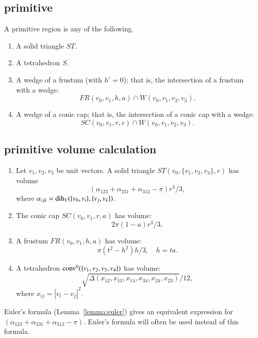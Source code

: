 \subsection{primitive}

\begin{definition} A primitive region is any of the following.

\begin{enumerate}%
 \item A solid triangle $ST$.
 \item A tetrahedron $S$.
 \item A wedge of a frustum (with $h'=0$); 
that is, the intersection of a frustum with
 a wedge:
    $$
     FR(v_0,v_1,h,a) \cap W(v_0,v_1,v_2,v_3).
    $$
\item A wedge of a conic cap; that is, the intersection of a conic cap
with
    a wedge:
    $$
    SC(v_0,v_1,r,c) \cap W(v_0,v_1,v_2,v_3).
    $$
\end{enumerate}

\end{definition}

\subsection{primitive volume calculation}\label{sec:primitive}

\begin{lemma} 
\begin{enumerate} 
 \item {} Let $v_1,v_2,v_3$ be unit vectors.
   A solid triangle $ST(v_0,\{v_1,v_2,v_3\},r)$ has volume
   $$
   (\alpha_{123}+\alpha_{231}+\alpha_{312}-\pi)r^3/3,
   $$
   where $\alpha_{ijk} = \operatorname{dih}_V(\{v_0,v_i\},\{v_j,v_k\})$.
  \item {} The conic cap $SC(v_0,v_1,r,a)$ has volume:
   $$
    2\pi(1-a) r^3/3,
   $$
 \item {} A frustum $FR(v_0,v_1,h,a)$ has volume:
   $$
   \pi (t^2-h^2) h/3,\quad h = t a.
   $$
 \item{} A tetrahedron ${\operatorname{conv}}^0(\{v_1,v_2,v_3,v_4\})$ has volume:
   $$
   \sqrt{\Delta(x_{12},x_{13},x_{14},x_{34},x_{24},x_{23})}/12,
   $$
   where $x_{ij} = |v_i-v_j|^2$.
\end{enumerate}
\end{lemma}

Euler's formula (Lemma~\ref{lemma:euler}) gives an
equivalent expression for $(\alpha_{123}+\alpha_{231}+\alpha_{312}-\pi)$.
Euler's formula will often be used instead of this formula.

